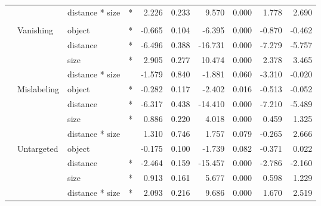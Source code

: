 \begin{longtable}[t]{llllrrrrrr}
\cmidrule{3-10}\nopagebreak
\hspace{1em} &  & distance * size & * & 2.226 & 0.233 & 9.570 & 0.000 & 1.778 & 2.690\\
\cmidrule{1-10}\pagebreak[0]
\addlinespace[0.3em]
\multicolumn{10}{l}{\textbf{Cascade R-CNN}}\\
\hspace{1em} & Vanishing & object & * & -0.665 & 0.104 & -6.395 & 0.000 & -0.870 & -0.462\\
\cmidrule{3-10}\nopagebreak
\hspace{1em} &  & distance & * & -6.496 & 0.388 & -16.731 & 0.000 & -7.279 & -5.757\\
\cmidrule{3-10}\nopagebreak
\hspace{1em} &  & size & * & 2.905 & 0.277 & 10.474 & 0.000 & 2.378 & 3.465\\
\cmidrule{3-10}\nopagebreak
\hspace{1em} &  & distance * size &  & -1.579 & 0.840 & -1.881 & 0.060 & -3.310 & -0.020\\
\cmidrule{2-10}\nopagebreak
\hspace{1em} & Mislabeling & object & * & -0.282 & 0.117 & -2.402 & 0.016 & -0.513 & -0.052\\
\cmidrule{3-10}\nopagebreak
\hspace{1em} &  & distance & * & -6.317 & 0.438 & -14.410 & 0.000 & -7.210 & -5.489\\
\cmidrule{3-10}\nopagebreak
\hspace{1em} &  & size & * & 0.886 & 0.220 & 4.018 & 0.000 & 0.459 & 1.325\\
\cmidrule{3-10}\nopagebreak
\hspace{1em} &  & distance * size &  & 1.310 & 0.746 & 1.757 & 0.079 & -0.265 & 2.666\\
\cmidrule{2-10}\nopagebreak
\hspace{1em} & Untargeted & object &  & -0.175 & 0.100 & -1.739 & 0.082 & -0.371 & 0.022\\
\cmidrule{3-10}\nopagebreak
\hspace{1em} &  & distance & * & -2.464 & 0.159 & -15.457 & 0.000 & -2.786 & -2.160\\
\cmidrule{3-10}\nopagebreak
\hspace{1em} &  & size & * & 0.913 & 0.161 & 5.677 & 0.000 & 0.598 & 1.229\\
\cmidrule{3-10}\nopagebreak
\hspace{1em} &  & distance * size & * & 2.093 & 0.216 & 9.686 & 0.000 & 1.670 & 2.519\\
\bottomrule
\end{longtable}
\endgroup{}
